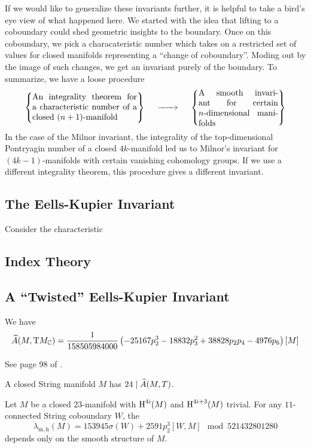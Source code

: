 If we would like to generalize these invariants further, it is helpful to take a bird's eye view of what happened here. We started with the idea that lifting to a coboundary could shed geometric insights to the boundary. Once on this coboundary, we pick a characateristic number which takes on a restricted set of values for closed manifolds representing a ``change of coboundary''. Moding out by the image of such changes, we get an invariant purely of the boundary. To summarize, we have a loose procedure
\[
	\left\{\parbox{12.5em}{An integrality theorem for a characteristic number of a closed $(n+1)$-manifold}\right\}
	\quad\lkxto\quad
	\left\{\parbox{9.5em}{A smooth invariant for certain $n$-dimensional manifolds}\right\}
\]
In the case of the Milnor invariant, the integrality of the top-dimensional Pontryagin number of a closed $4k$-manifold led us to Milnor's invariant for $(4k-1)$-manifolds with certain vanishing cohomology groups. 
If we use a different integrality theorem, this procedure gives a different invariant.

\subsection{The Eells-Kupier Invariant}\label{sec:eells-kupier-invariant}

Consider the characteristic 

\subsection{Index Theory}

\subsection{A ``Twisted'' Eells-Kupier Invariant}
\begin{definition}
	We have
	\[
		\widehat{A}(M,\mathrm{T} M_{\mathbb{C}}) = \frac{1}{158505984000}\left(-25167p_2^3 - 18832p_3^2 + 38828p_2p_4 - 4976p_6\right)[M]
	\]
\end{definition}
	See page 98 of \cite{hopkinsmahowald2002bo8}.


\begin{theorem}
	A closed String manifold $M$ has $24\mid \widehat{A}(M,T)$.
\end{theorem}

\begin{corollary}
	Let $M$ be a closed $23$-manifold with $\operatorname{H}^{4i}(M)$ and $\operatorname{H}^{4i+3}(M)$ trivial. For any $11$-connected String coboundary $W$, the  
	\[
		\lambda_{\mathrm{m,h}}(M) = 153945\sigma(W) + 2591p_2^3[W,M]\mod 521432801280
	\]
	depends only on the smooth structure of $M$.
\end{corollary}
